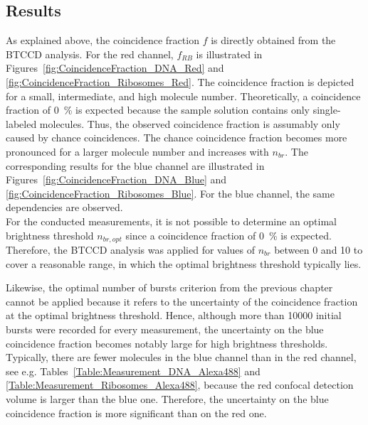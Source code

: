 \subsection{Results}

As explained above, the coincidence fraction $f$ is directly obtained from the \gls{BTCCD} analysis. For the red channel, $f_{RB}$ is illustrated in Figures~\ref{fig:CoincidenceFraction_DNA_Red} and \ref{fig:CoincidenceFraction_Ribosomes_Red}. The coincidence fraction is depicted for a small, intermediate, and high molecule number. Theoretically, a coincidence fraction of \SI{0}{\percent} is expected because the sample solution contains only single-labeled molecules. Thus, the observed coincidence fraction is assumably only caused by chance coincidences. The chance coincidence fraction becomes more pronounced for a larger molecule number and increases with $n_{br}$. The corresponding results for the blue channel are illustrated in Figures~\ref{fig:CoincidenceFraction_DNA_Blue} and \ref{fig:CoincidenceFraction_Ribosomes_Blue}. For the blue channel, the same dependencies are observed.\\

For the conducted measurements, it is not possible to determine an optimal brightness threshold $n_{br,opt}$ since a coincidence fraction of \SI{0}{\percent} is expected. Therefore, the \gls{BTCCD} analysis was applied for values of $n_{br}$ between \num{0} and \num{10} to cover a reasonable range, in which the optimal brightness threshold typically lies. 

Likewise, the optimal number of bursts criterion from the previous chapter cannot be applied because it refers to the uncertainty of the coincidence fraction at the optimal brightness threshold. Hence, although more than \num{10000} initial bursts were recorded for every measurement, the uncertainty on the blue coincidence fraction becomes notably large for high brightness thresholds. Typically, there are fewer molecules in the blue channel than in the red channel, see e.g. Tables~\ref{Table:Measurement_DNA_Alexa488} and \ref{Table:Measurement_Ribosomes_Alexa488}, because the red confocal detection volume is larger than the blue one. Therefore, the uncertainty on the blue coincidence fraction is more significant than on the red one. \\

